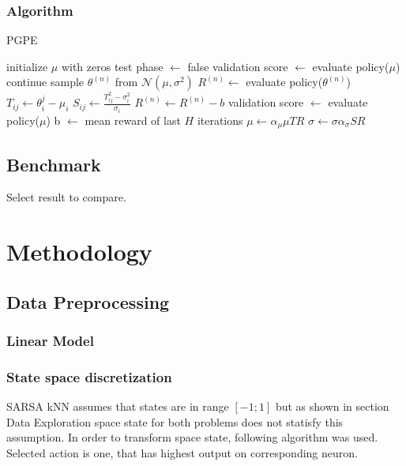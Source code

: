 \documentclass[12pt]{article}
\begin{document}
\subsubsection{Algorithm}

\begin{algorithm}
\caption{PGPE}
\begin{algorithmic}[1]
\State initialize $\mu$ with zeros
\State test phase $\gets$ false
		\State validation score $\gets$ evaluate policy($\mu$)
		\State continue
	\EndIf
		\State sample $\theta^{(n)}$ from $\mathcal{N}(\mu, \sigma^2)$
	\State $R^{(n)} \gets$ evaluate policy($\theta^{(n)}$)
	\EndFor
	\State $T_{ij} \gets \theta_i^{j} - \mu_i$
	\State $S_{ij} \gets \frac{T_{ij}^2 - \sigma_i^2}{\sigma_i}$
	\State $R^{(n)} \gets R^{(n)} - b$
	\State validation score $\gets$ evaluate policy($\mu$)
	\State b $\gets$ mean reward of last $H$ iterations
	\EndIf
	\State $\mu \gets \alpha_\mu \mu TR$
	\State $\sigma \gets \sigma \alpha_\sigma SR$
\EndWhile

\end{algorithmic}
\end{algorithm}


\subsection{Benchmark}

Select result to compare.

\section{Methodology}
\subsection{Data Preprocessing}
\subsubsection{Linear Model}
\subsubsection{State space discretization}

SARSA kNN assumes that states are in range $[-1;1]$ but as shown in section Data Exploration space state for both problems does not statisfy this assumption. In order to transform space state, following algorithm was used. Selected action is one, that has highest output on corresponding neuron. 
\end{document}
